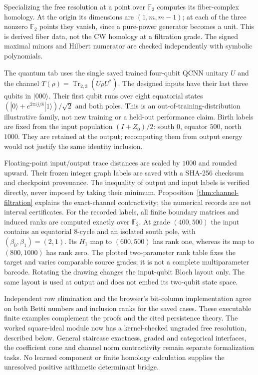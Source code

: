 Specializing the free resolution at a point over $\mathbb F_2$ computes
its fiber-complex homology. At the origin its dimensions are
$(1,m,m-1)$; at each of the three nonzero $\mathbb F_2$ points they vanish,
since a pure-power generator becomes a unit. This is derived fiber data,
not the CW homology at a filtration grade. The signed maximal minors and
Hilbert numerator are checked independently with symbolic polynomials.

The quantum tab uses the single saved trained four-qubit QCNN unitary $U$
and the channel $T(\rho)=\operatorname{Tr}_{2,3}(U\rho U^*)$.
The designed inputs have their last three qubits in $|000\rangle$.
Their first qubit runs over eight equatorial states
$(|0\rangle+e^{2\pi i j/8}|1\rangle)/\sqrt2$ and both poles.
This is an out-of-training-distribution illustrative family, not new
training or a held-out performance claim. Birth labels are fixed from the
input population $(I+Z_0)/2$: south $0$, equator $500$, north $1000$.
They are retained at the output; recomputing them from output energy
would not justify the same identity inclusion.

Floating-point input/output trace distances are scaled by $1000$ and
rounded upward. Their frozen integer graph labels are saved with a SHA-256
checksum and checkpoint provenance. The inequality of output and input
labels is verified directly, never imposed by taking their minimum.
Proposition~\ref{thm:channel-filtration} explains the exact-channel contractivity;
the numerical records are not interval certificates. For the recorded labels,
all finite boundary matrices and induced ranks are computed exactly over
$\mathbb F_2$. At grade $(400,500)$ the input contains an equatorial
8-cycle and an isolated south pole, with $(\beta_0,\beta_1)=(2,1)$.
Its $H_1$ map to $(600,500)$ has rank one, whereas its map to $(800,1000)$
has rank zero. The plotted two-parameter rank table fixes the target and
varies comparable source grades; it is not a complete multiparameter barcode.
Rotating the drawing changes the input-qubit Bloch layout only. The same
layout is used at output and does not embed its two-qubit state space.

Independent row elimination and the browser's bit-column implementation
agree on both Betti numbers and inclusion ranks for the saved cases.
These executable finite examples complement the proofs and the cited
persistence theory. The worked square-ideal module now has a kernel-checked ungraded
free resolution, described below. General staircase exactness, graded and
categorical interfaces, the coefficient cone and channel norm contractivity
remain separate formalization tasks. No learned
component or finite homology calculation supplies the unresolved positive
arithmetic determinant bridge.

